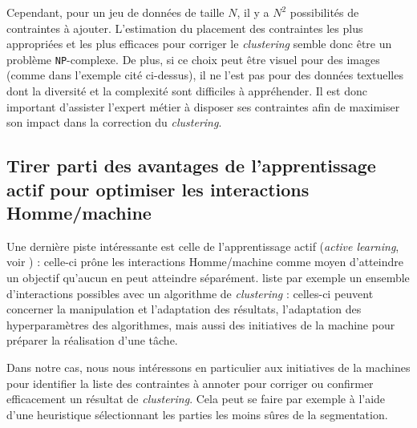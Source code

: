 		Cependant, pour un jeu de données de taille $N$, il y a $N^2$ possibilités de contraintes à ajouter.
		L'estimation du placement des contraintes les plus appropriées et les plus efficaces pour corriger le \textit{clustering} semble donc être un problème \texttt{NP}-complexe.
		De plus, si ce choix peut être visuel pour des images (comme dans l'exemple cité ci-dessus), il ne l'est pas pour des données textuelles dont la diversité et la complexité sont difficiles à appréhender.
		Il est donc important d'assister l'expert métier à disposer ses contraintes afin de maximiser son impact dans la correction du \textit{clustering}.
		
	
	\subsection{Tirer parti des avantages de l'apprentissage actif pour optimiser les interactions Homme/machine}
	\label{section:3.1.3-INTUITIONS-ORIGINES-APPRENTISSAGE-ACTIF}
	
		Une dernière piste intéressante est celle de l'apprentissage actif (\textit{active learning}, voir \cite{settles:2010:active-learning-literature}) : celle-ci prône les interactions Homme/machine comme moyen d'atteindre un objectif qu'aucun en peut atteindre séparément.
		\cite{bae-etal:2021:interactive-clustering-comprehensive} liste par exemple un ensemble d'interactions possibles avec un algorithme de \textit{clustering} : celles-ci peuvent concerner la manipulation et l'adaptation des résultats, l'adaptation des hyperparamètres des algorithmes, mais aussi des initiatives de la machine pour préparer la réalisation d'une tâche.
		
		Dans notre cas, nous nous intéressons en particulier aux initiatives de la machines pour identifier la liste des contraintes à annoter pour corriger ou confirmer efficacement un résultat de \textit{clustering}.
		Cela peut se faire par exemple à l'aide d'une heuristique sélectionnant les parties les moins sûres de la segmentation.
	
